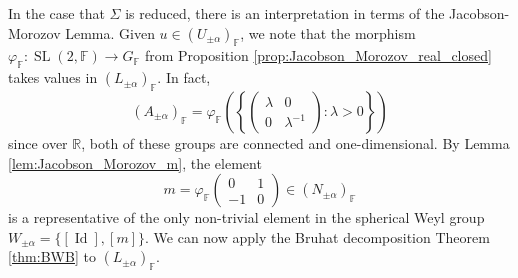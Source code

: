 \documentclass[12pt]{amsart}
\newcommand{\F}{\mathbb{F} }
\newcommand{\R}{\mathbb{R} }
\numberwithin{equation}{section}
\theoremstyle{remark} %
\begin{document}
In the case that $\Sigma$ is reduced, there is an interpretation in terms of the Jacobson-Morozov Lemma. Given $u \in (U_{\pm \alpha})_\F$, we note that the morphism $\varphi_\F \colon \operatorname{SL}(2,\F) \to G_\F$ from Proposition \ref{prop:Jacobson_Morozov_real_closed} takes values in $(L_{\pm \alpha})_\F$. In fact, 
$$
(A_{\pm \alpha})_\F = \varphi_\F\left( \left\{ \begin{pmatrix}
	\lambda & 0 \\ 0 & \lambda^{-1}
\end{pmatrix}   \colon \lambda>0 \right\} \right)
$$
since over $\R$, both of these groups are connected and one-dimensional.
By Lemma \ref{lem:Jacobson_Morozov_m}, the element
$$
m = \varphi_\F\begin{pmatrix}
	0 & 1 \\ -1 & 0
\end{pmatrix} \in (N_{\pm \alpha})_\F
$$
is a representative of the only non-trivial element in the spherical Weyl group $W_{\pm \alpha} = \{ [\operatorname{Id}] , [m] \}$. We can now apply the Bruhat decomposition Theorem \ref{thm:BWB} to $(L_{\pm \alpha})_\F$.
\end{document}
